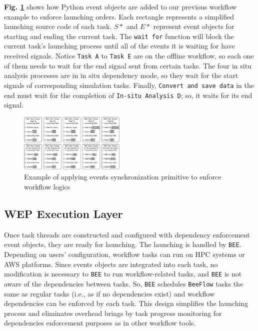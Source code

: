 \textbf{Fig. \ref{exp}} shows how Python event objects are added to our previous workflow example to enforce launching orders. Each rectangle represents a simplified launching source code of each task. $S*$ and $E*$ represent event objects for starting and ending the current task. The \texttt{wait for} function will block the current task's launching process until all of the events it is waiting for have received signals. Notice \texttt{Task A} to \texttt{Task E} are on the offline workflow, so each one of them needs to wait for the end signal sent from certain tasks. The four in situ analysis processes are in in situ dependency mode, so they wait for the start signals of corresponding simulation tasks. Finally, \texttt{Convert and save data} in the end must wait for the completion of \texttt{In-situ Analysis D}; so, it waits for its end signal.
\begin{figure}[h]
    \centering
    \includegraphics[width=0.45\textwidth]{figures/exp.pdf}
    \caption{Example of applying events synchronization primitive to enforce workflow logics}
    \label{exp}
    
\end{figure}


\subsection{WEP Execution Layer}
Once task threads are constructed and configured with dependency enforcement event objects, they are ready for launching. The launching is handled by \texttt{BEE}. Depending on users' configuration, workflow tasks can run on HPC systems or AWS platforms. Since events objects are integrated into each task, no modification is necessary to \texttt{BEE} to run workflow-related tasks, and \texttt{BEE} is not aware of the dependencies between tasks. So, \texttt{BEE} schedules \texttt{BeeFlow} tasks the same as regular tasks (i.e., as if no dependencies exist) and workflow dependencies can be enforced by each task. This design simplifies the launching process and eliminates overhead brings by task progress monitoring for dependencies enforcement purposes as in other workflow tools. 

